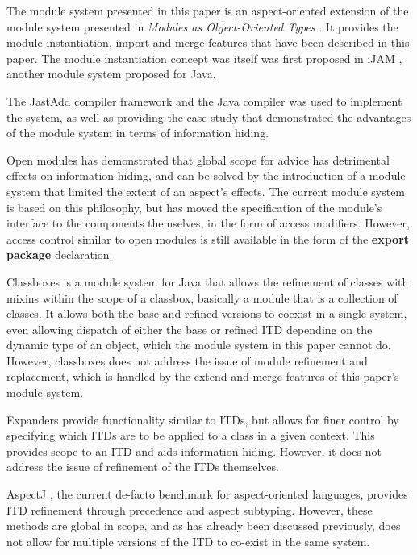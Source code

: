 The module system presented in this paper is an aspect-oriented extension of the module
system presented in \textit{Modules as Object-Oriented Types} \cite{modulesastypes}. It
provides the module instantiation, import and merge features that have been described in
this paper. The module instantiation concept was itself was first proposed in iJAM \cite{iJAM}, 
another module system proposed for Java.

The JastAdd compiler framework and the Java compiler \cite{jastadd, jastaddjavacompiler}
was used to implement the system, as well as providing the case study that demonstrated 
the advantages of the module system in terms of information hiding.

Open modules \cite{openmodules, openmodulesaj} has demonstrated that global scope for advice
has detrimental effects on information hiding, and can be solved by
the introduction of a module system that limited the extent of an aspect's effects. The
current module system is based on this philosophy, but has moved the specification of
the module's interface to the components themselves, in the form of access modifiers.
However, access control similar to open modules is still available in the form of the
\textbf{export package} declaration.

Classboxes \cite{classboxj} is a module system for Java that allows the refinement of classes
with mixins within the scope of a classbox, basically a module that is a collection of classes. 
It allows both the base and refined versions to coexist in a single system, even allowing
dispatch of either the base or refined ITD depending on the dynamic type of an object, which
the module system in this paper cannot do. However, classboxes does not address the issue of
module refinement and replacement, which is handled by the extend and merge features of
this paper's module system.

Expanders \cite{expanders} provide functionality similar to ITDs, but allows for finer control
by specifying which ITDs are to be applied to a class in a given context. This provides scope
to an ITD and aids information hiding. However, it does not address the issue of refinement of 
the ITDs themselves.

AspectJ \cite{overviewaspectj}, the current de-facto benchmark for aspect-oriented languages, 
provides ITD refinement through precedence and aspect subtyping. However, these methods are
global in scope, and as has already been discussed previously, does not allow for multiple
versions of the ITD to co-exist in the same system.

